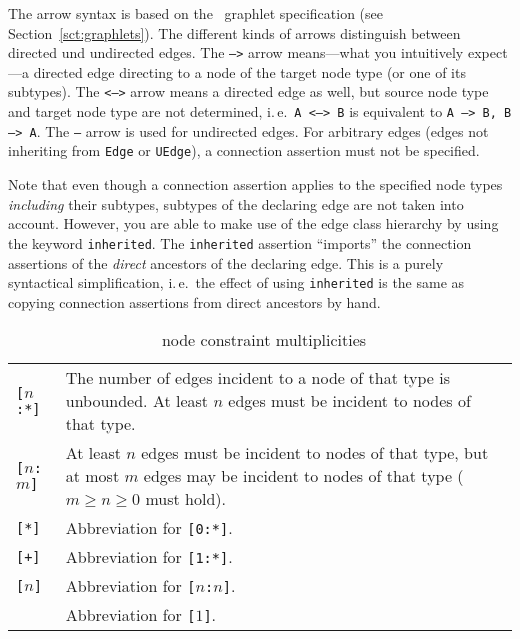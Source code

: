 The arrow syntax is based on the \GrG\ graphlet specification (see Section~\ref{sct:graphlets}).
The different kinds of arrows distinguish between directed und undirected edges.
The \texttt{-->} arrow means---what you intuitively expect---a directed edge directing to a node of the target node type (or one of its subtypes).
The \texttt{<-->} arrow means a directed edge as well, but source node type and target node type are not determined, i.\,e.\ \texttt{A <--> B} is equivalent to \texttt{A --> B, B --> A}.
The \texttt{--} arrow is used for undirected edges.
For arbitrary edges (edges not inheriting from \texttt{Edge} or \texttt{UEdge}), a connection assertion must not be specified.

Note that even though a connection assertion applies to the specified node types \emph{including} their subtypes, subtypes of the declaring edge are not taken into account.
However, you are able to make use of the edge class hierarchy by using the keyword \texttt{inherited}.
The \texttt{inherited} assertion ``imports'' the connection assertions of the \emph{direct} ancestors of the declaring edge.
This is a purely syntactical simplification, i.\,e.\ the effect of using \texttt{inherited} is the same as copying connection assertions from direct ancestors by hand.

\begin{table}[htbp]
\begin{tabularx}{\linewidth}{|l|X|}\hline
	\texttt{[$n$:*]} & The number of edges incident to a node of that type is unbounded. At least $n$ edges must be incident to nodes of that type.\\ 
	\texttt{[$n$:$m$]} & At least $n$ edges must be incident to nodes of that type, but at most $m$ edges may be incident to nodes of that type ($m \geq n \geq 0$ must hold).\\
	\texttt{[*]} & Abbreviation for \texttt{[0:*]}.\\
	\texttt{[+]} & Abbreviation for \texttt{[1:*]}.\\
	\texttt{[$n$]} & Abbreviation for \texttt{[$n$:$n$]}.\\
	               & Abbreviation for \texttt{[$1$]}. \\ \hline
\end{tabularx}
\caption{\GrG\ node constraint multiplicities}
\label{multiplicities}
\end{table}

